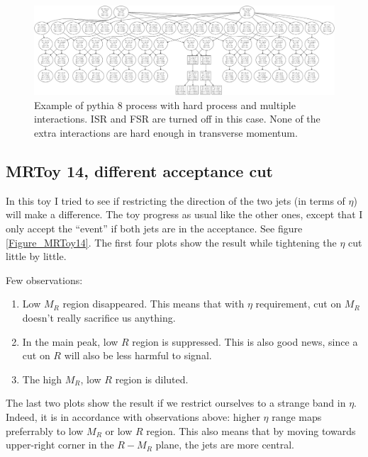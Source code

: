 \documentclass{fheadnote}
\begin{document}
\begin{figure}[htbp]
   \centering
   \includegraphics[width=15cm]{Figures/Pythia8MIExample}
   \caption{Example of pythia 8 process with hard process and multiple interactions.  ISR and FSR are turned off in this case.  None of the extra interactions are hard enough in transverse momentum.}
   \label{Figure_Pythia8MIExample}
\end{figure}

\subsection{MRToy 14, different acceptance cut}

In this toy I tried to see if restricting the direction of the two jets (in terms of $\eta$) will make a difference.
The toy progress as usual like the other ones, except that I only accept the ``event'' if both jets are in the acceptance.
See figure \ref{Figure_MRToy14}.   The first four plots show the result while tightening the $\eta$ cut little by little.

Few observations:
\begin{enumerate}
\item Low $M_R$ region disappeared.  This means that with $\eta$ requirement, cut on $M_R$ doesn't really sacrifice us anything.
\item In the main peak, low $R$ region is suppressed.  This is also good news, since a cut on $R$ will also be less harmful to signal.
\item The high $M_R$, low $R$ region is diluted.
\end{enumerate}

The last two plots show the result if we restrict ourselves to a strange band in $\eta$.
Indeed, it is in accordance with observations above: higher $\eta$ range maps preferrably to low $M_R$ or low $R$ region.
This also means that by moving towards upper-right corner in the $R-M_R$ plane, the jets are more central.
\end{document}

